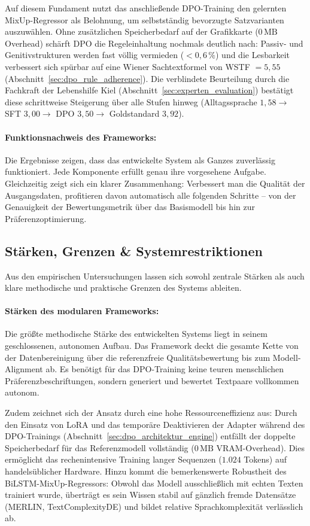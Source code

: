 Auf diesem Fundament nutzt das anschließende DPO-Training den gelernten MixUp-Regressor als Belohnung, um selbstständig bevorzugte Satzvarianten auszuwählen. Ohne zusätzlichen Speicherbedarf auf der Grafikkarte ($0\,\text{MB}$ Overhead) schärft DPO die Regeleinhaltung nochmals deutlich nach: Passiv- und Genitivstrukturen werden fast völlig vermieden ($< 0{,}6\,\%$) und die Lesbarkeit verbessert sich spürbar auf eine Wiener Sachtextformel von WSTF $= 5{,}55$ (Abschnitt~\ref{sec:dpo_rule_adherence}). Die verblindete Beurteilung durch die Fachkraft der Lebenshilfe Kiel (Abschnitt~\ref{sec:experten_evaluation}) bestätigt diese schrittweise Steigerung über alle Stufen hinweg (Alltagssprache $1{,}58 \to$ SFT $3{,}00 \to$ DPO $3{,}50 \to$ Goldstandard $3{,}92$).

\paragraph{Funktionsnachweis des Frameworks:}
Die Ergebnisse zeigen, dass das entwickelte System als Ganzes zuverlässig funktioniert. Jede Komponente erfüllt genau ihre vorgesehene Aufgabe. Gleichzeitig zeigt sich ein klarer Zusammenhang: Verbessert man die Qualität der Ausgangsdaten, profitieren davon automatisch alle folgenden Schritte – von der Genauigkeit der Bewertungsmetrik über das Basismodell bis hin zur Präferenzoptimierung.

\subsection{Stärken, Grenzen \& Systemrestriktionen}
\label{sec:diskussion_grenzen}

Aus den empirischen Untersuchungen lassen sich sowohl zentrale Stärken als auch klare methodische und praktische Grenzen des Systems ableiten.

\paragraph{Stärken des modularen Frameworks:}
Die größte methodische Stärke des entwickelten Systems liegt in seinem geschlossenen, autonomen Aufbau. Das Framework deckt die gesamte Kette von der Datenbereinigung über die referenzfreie Qualitätsbewertung bis zum Modell-Alignment ab. Es benötigt für das DPO-Training keine teuren menschlichen Präferenzbeschriftungen, sondern generiert und bewertet Textpaare vollkommen autonom. 

Zudem zeichnet sich der Ansatz durch eine hohe Ressourceneffizienz aus: Durch den Einsatz von LoRA und das temporäre Deaktivieren der Adapter während des DPO-Trainings (Abschnitt~\ref{sec:dpo_architektur_engine}) entfällt der doppelte Speicherbedarf für das Referenzmodell vollständig ($0\,\text{MB}$ VRAM-Overhead). Dies ermöglicht das rechenintensive Training langer Sequenzen ($1.024$ Tokens) auf handelsüblicher Hardware. Hinzu kommt die bemerkenswerte Robustheit des BiLSTM-MixUp-Regressors: Obwohl das Modell ausschließlich mit echten Texten trainiert wurde, überträgt es sein Wissen stabil auf gänzlich fremde Datensätze (MERLIN, TextComplexityDE) und bildet relative Sprachkomplexität verlässlich ab.

